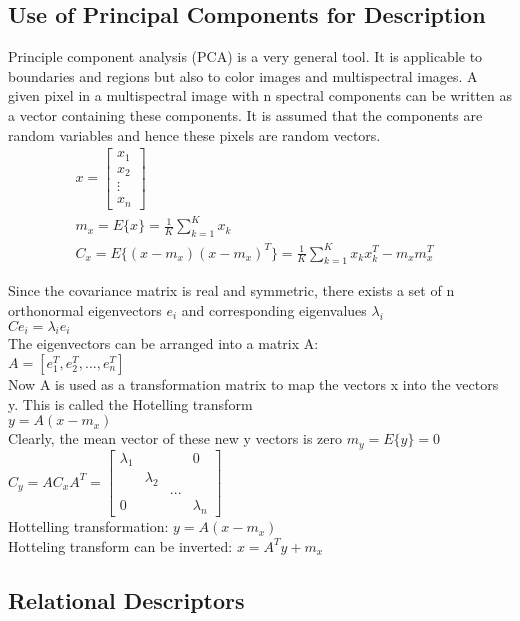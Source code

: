 \subsection{Use of Principal Components for Description}
Principle component analysis (PCA) is a very general tool. It is applicable to boundaries and regions but also to color images and multispectral images. A given pixel in a multispectral image with n spectral components can be written as a vector containing these components. It is assumed that the components are random variables and hence these pixels are random vectors.
\begin{align*}
& x = \left[\begin{array}{c} x_1 \\ x_2 \\ \vdots \\ x_n \end{array}\right]&&\\
& m_x = E\{x\} = \frac{1}{K}\sum\limits_{k=1}^{K}x_k&&\\
& C_x = E\{(x-m_x)(x-m_x)^T\}=\frac{1}{K}\sum\limits_{k=1}^{K}x_kx_k^T-m_xm_x^T
\end{align*}

Since the covariance matrix is real and symmetric, there exists a set of n orthonormal eigenvectors $e_i$ and corresponding eigenvalues $\lambda_i$\\
$Ce_i=\lambda_ie_i$\\
The eigenvectors can be arranged into a matrix A:\\
$A=[e_1^T, e_2^T, ..., e_n^T]$\\
Now A is used as a transformation matrix to map the vectors x into the vectors y. This is called the Hotelling transform\\
$y=A(x-m_x)$\\
Clearly, the mean vector of these new y vectors is zero $m_y=E\{y\}=0$\\
$C_y=AC_xA^T=\left[
\begin{matrix}
 \lambda_1 & & & 0 \\
 & \lambda_2 & & \\
 & & ... & \\
 0 & & & \lambda_n
\end{matrix}\right]	$\\
Hottelling transformation: $y=A(x-m_x)$\\
Hotteling transform can be inverted: $x=A^Ty+m_x$\\

\subsection{Relational Descriptors}

